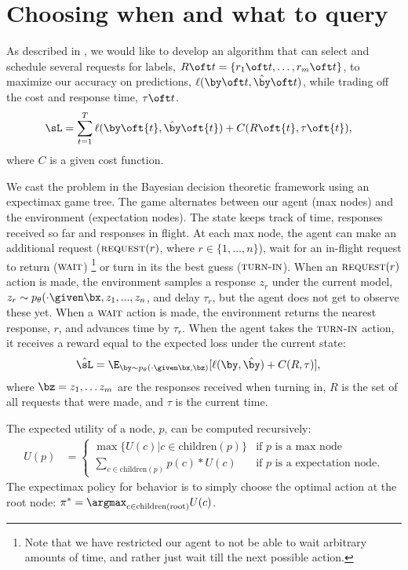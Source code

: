 \section{Choosing when and what to query}
\label{sec:async}

As described in ,
we would like to develop an algorithm that can select and schedule several requests for labels, $R\oft t = \{r_1\oft t, \ldots, r_m\oft t\}$, to maximize our accuracy on predictions, $\ell(\by\oft t, \byt\oft t)$, while trading off the cost and response time, $\tau\oft t$. 
\begin{align*}
  \sL &= \sum_{t=1}^T \ell(\by\oft{t}, \byt\oft{t}) + C(R\oft{t}, \tau\oft{t}),
\end{align*}
where $C$ is a given cost function.

We cast the problem in the Bayesian decision theoretic framework using an expectimax game tree.
The game alternates between our agent (max nodes) and the environment (expectation nodes).
The state keeps track of time, responses received so far and responses in flight.
At each max node, the agent can make an additional request ($\operatorname{\textsc{request}}(r)$, where $r \in \{1, \ldots, n\}$), wait for an in-flight request to return ($\operatorname{\textsc{wait}}$)
\footnote{Note that we have restricted our agent to not be able to wait arbitrary amounts of time, and rather just wait till the next possible action.}
or turn in its the best guess ($\operatorname{\textsc{turn-in}}$).
When an $\operatorname{\textsc{request}}(r)$ action is made, the environment samples a response $z_r$ under the current model, $z_r \sim \p(\cdot \given \bx, z_1, ..., z_n$, and delay $\tau_r$, but the agent does not get to observe these yet.
When a $\operatorname{\textsc{wait}}$ action is made, the environment returns the nearest response, $r$, and advances time by $\tau_r$.
When the agent takes the $\operatorname{\textsc{turn-in}}$ action, it receives a reward equal to the expected loss under the current state:
\begin{align*}
  \hat\sL &= \E_{\by \sim \p(\cdot \given \bx, \bz)}[\ell(\by, \byt) + C(R, \tau)],
\end{align*}
where $\bz = z_1, \dots z_m$ are the responses received when turning in, $R$ is the set of all requests that were made, and $\tau$ is the current time.

The expected utility of a node, $p$, can be computed recursively:
\begin{align*}
  U(p) &= 
  \begin{cases}
    \max\{ U(c) | c \in \textrm{children}(p) \} & \textrm{if $p$ is a max node} \\
    \sum_{c \in \textrm{children}(p)} p(c) * U(c) & \textrm{if $p$ is a expectation node}.
  \end{cases}
\end{align*}
The expectimax policy for behavior is to simply choose the optimal action at the root node: $\pi^* = \argmax_{c \in \textrm{children}(\textrm{root})} U(c)$.

